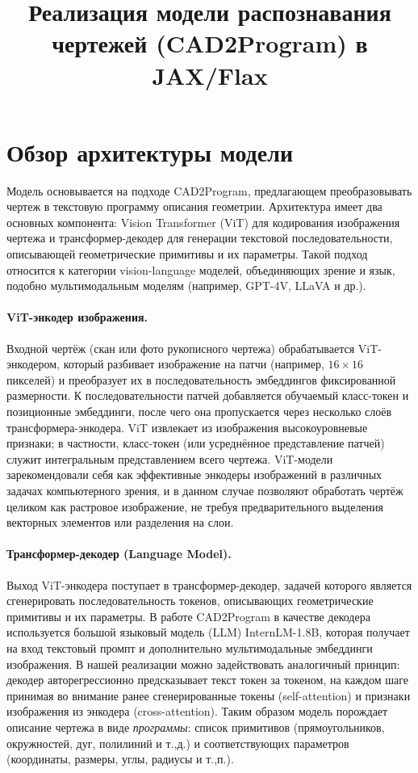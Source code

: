 \documentclass{article}
\begin{document}
\title{Реализация модели распознавания чертежей (CAD2Program) в JAX/Flax}
\author{}
\date{}
\maketitle

\section{Обзор архитектуры модели}

Модель основывается на подходе CAD2Program, предлагающем преобразовывать чертеж в текстовую программу описания геометрии. Архитектура имеет два основных компонента: Vision Transformer (ViT) для кодирования изображения чертежа и трансформер-декодер для генерации текстовой последовательности, описывающей геометрические примитивы и их параметры. Такой подход относится к категории vision-language моделей, объединяющих зрение и язык, подобно мультимодальным моделям (например, GPT-4V, LLaVA и др.).

\paragraph{ViT-энкодер изображения.} Входной чертёж (скан или фото рукописного чертежа) обрабатывается ViT-энкодером, который разбивает изображение на патчи (например, $16\times16$ пикселей) и преобразует их в последовательность эмбеддингов фиксированной размерности. К последовательности патчей добавляется обучаемый класс-токен и позиционные эмбеддинги, после чего она пропускается через несколько слоёв трансформера-энкодера. ViT извлекает из изображения высокоуровневые признаки; в частности, класс-токен (или усреднённое представление патчей) служит интегральным представлением всего чертежа. ViT-модели зарекомендовали себя как эффективные энкодеры изображений в различных задачах компьютерного зрения, и в данном случае позволяют обработать чертёж целиком как растровое изображение, не требуя предварительного выделения векторных элементов или разделения на слои.

\paragraph{Трансформер-декодер (Language Model).} Выход ViT-энкодера поступает в трансформер-декодер, задачей которого является сгенерировать последовательность токенов, описывающих геометрические примитивы и их параметры. В работе CAD2Program в качестве декодера используется большой языковый модель (LLM) InternLM-1.8B, которая получает на вход текстовый промпт и дополнительно мультимодальные эмбеддинги изображения. В нашей реализации можно задействовать аналогичный принцип: декодер авторегрессионно предсказывает текст токен за токеном, на каждом шаге принимая во внимание ранее сгенерированные токены (self-attention) и признаки изображения из энкодера (cross-attention). Таким образом модель порождает описание чертежа в виде \textit{программы}: список примитивов (прямоугольников, окружностей, дуг, полилиний и т.,д.) и соответствующих параметров (координаты, размеры, углы, радиусы и т.,п.).
\end{document}
